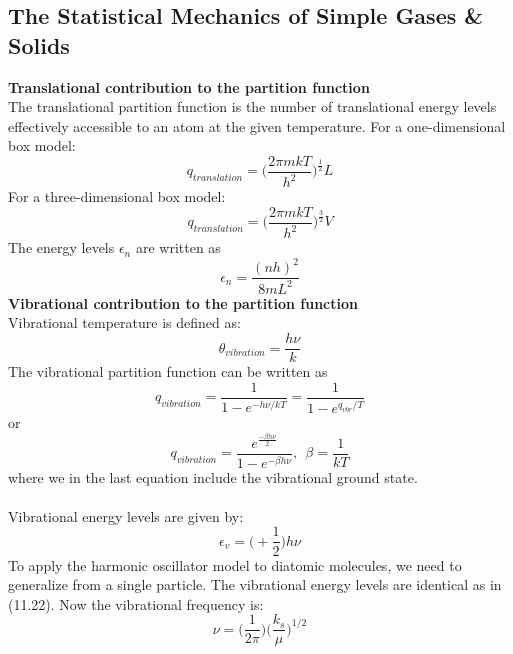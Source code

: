 \documentclass[8pt]{article}
\numberwithin{equation}{section}
\begin{document}
\begin{multicols}{2}
\section{The Statistical Mechanics of Simple Gases \& Solids}
\textbf{Translational contribution to the partition function} \\ 
The translational partition function is the number of translational energy levels effectively accessible to an atom at the given temperature. 
For a one-dimensional box model:
\begin{equation}
q_{translation}=\bigg(\frac{2\pi mkT}{h^{2}}\bigg)^{\frac{1}{2}}L \tag{11.15}
\end{equation}
For a three-dimensional box model:
\begin{equation}
q_{translation}=\bigg(\frac{2\pi mkT}{h^{2}}\bigg)^{\frac{3}{2}}V \tag{11.18}
\end{equation}
The energy levels $\epsilon_{n}$ are written as 
\begin{equation}
\epsilon_{n}=\frac{(nh)^{2}}{8mL^{2}} \tag{11.12}
\end{equation}
\textbf{Vibrational contribution to the partition function} \\ 
Vibrational temperature is defined as: 
\begin{equation}
\theta_{vibration}=\frac{h\nu}{k} \tag{p. 203}
\end{equation}
The vibrational partition function can be written as
\begin{equation}
q_{vibration}=\frac{1}{1-e^{-h\nu/kT}}=\frac{1}{1-e^{q_{vbr}/T}} \tag{11.26}
\end{equation}
or 
\begin{equation}
q_{vibration}=\frac{e^{\frac{-\beta h\nu}{2}}}{1-e^{-\beta h\nu}}, \ \ \beta = \frac{1}{kT} \tag{11.26}
\end{equation}
where we in the last equation include the vibrational ground state. \\ \\
Vibrational energy levels are given by: 
\begin{equation}
\epsilon_{v}=\bigg(+\frac{1}{2}\bigg)h\nu \tag{11.22}
\end{equation}
To apply the harmonic oscillator model to diatomic molecules, we need to generalize from a single particle. The vibrational energy levels are identical as in (11.22). Now the vibrational frequency is: 
\begin{equation}
\nu=\bigg(\frac{1}{2\pi} \bigg)\bigg(\frac{k_{s}}{\mu}\bigg)^{1/2} \tag{11.23}
\end{equation}

\end{multicols}
\end{document}
